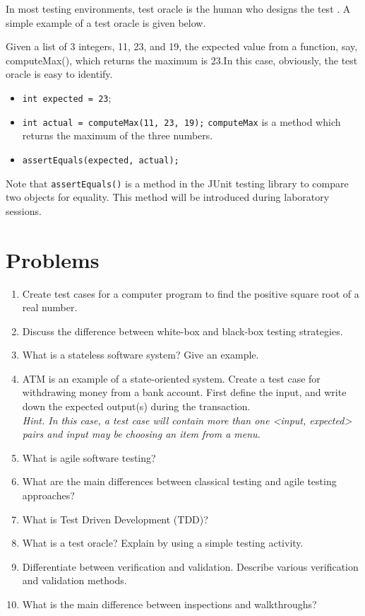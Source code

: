 In most testing environments, test oracle is the human who designs the test \autocite{bertolino1996use}. A simple example of a test oracle is given below. 

Given a list of 3 integers, 11, 23, and 19, the expected value from a function, say, computeMax(), which returns the maximum is 23.In this case, obviously, the test oracle is easy to identify.

\begin{itemize}
    \item \lstinline!int expected = 23!; 
    \item \lstinline!int actual = computeMax(11, 23, 19);! \lstinline!computeMax! is a method which returns the maximum of the three numbers.
    \item \lstinline!assertEquals(expected, actual);!
\end{itemize}

Note that \lstinline!assertEquals()! is a method in the JUnit testing library to compare two objects for equality. This method will be introduced during laboratory sessions.

\section{Problems}
\begin{enumerate}
    \item Create test cases for a computer program to find the positive square root of a real number.
    \item Discuss the difference between white-box and black-box testing strategies.
    \item What is a stateless software system? Give an example.
    \item ATM is an example of a state-oriented system. Create a test case for withdrawing money from a bank account. First define the input, and write down the expected output(s) during the transaction.\\
    \emph{Hint. In this case, a test case will contain more than one <input, expected> pairs and input may be choosing an item from a menu.}
    \item What is agile software testing? 
    \item What are the main differences between classical testing and agile testing approaches?
    \item What is Test Driven Development (TDD)?
    \item What is a test oracle? Explain by using a simple testing activity.
    \item Differentiate between verification and validation. Describe various verification and validation methods.
    \item What is the main difference between inspections and walkthroughs?
\end{enumerate}